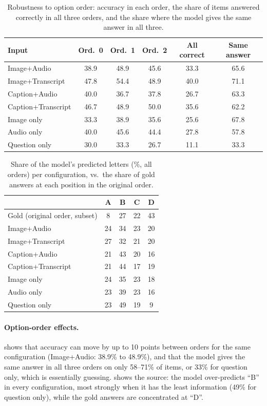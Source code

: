\documentclass{article}
\begin{document}
\begin{table}[h]
\caption{Robustness to option order: accuracy in each order, the share of items answered correctly in
all three orders, and the share where the model gives the same answer in all three.}
\label{tab:app-perm}
\centering\small
\setlength{\tabcolsep}{3.5pt}
\begin{tabular}{lccccc}
\toprule
Input & Ord.\ 0 & Ord.\ 1 & Ord.\ 2 & All correct & Same answer \\
\midrule
Image+Audio        & 38.9 & 48.9 & 45.6 & 33.3 & 65.6 \\
Image+Transcript   & 47.8 & 54.4 & 48.9 & 40.0 & 71.1 \\
Caption+Audio      & 40.0 & 36.7 & 37.8 & 26.7 & 63.3 \\
Caption+Transcript & 46.7 & 48.9 & 50.0 & 35.6 & 62.2 \\
Image only         & 33.3 & 38.9 & 35.6 & 25.6 & 67.8 \\
Audio only         & 40.0 & 45.6 & 44.4 & 27.8 & 57.8 \\
Question only      & 30.0 & 33.3 & 26.7 & 11.1 & 33.3 \\
\bottomrule
\end{tabular}
\end{table}

\begin{table}[h]
\caption{Share of the model's predicted letters (\%, all orders) per configuration, vs.\ the share of
gold answers at each position in the original order.}
\label{tab:app-letters}
\centering\small
\begin{tabular}{lcccc}
\toprule
 & A & B & C & D \\
\midrule
Gold (original order, subset) & 8 & 27 & 22 & 43 \\
\midrule
Image+Audio        & 24 & 34 & 23 & 20 \\
Image+Transcript   & 27 & 32 & 21 & 20 \\
Caption+Audio      & 21 & 43 & 20 & 16 \\
Caption+Transcript & 21 & 44 & 17 & 19 \\
Image only         & 24 & 35 & 23 & 18 \\
Audio only         & 23 & 39 & 23 & 16 \\
Question only      & 23 & 49 & 19 &  9 \\
\bottomrule
\end{tabular}
\end{table}

\paragraph{Option-order effects.}  shows that accuracy can
move by up to 10 points between orders for the same configuration (Image+Audio:
38.9\% to 48.9\%), and that the model gives the same answer in all three orders
on only 58--71\% of items, or 33\% for question only, which is essentially guessing.
 shows the source: the model over-predicts ``B'' in every
configuration, most strongly when it has the least information (49\% for question
only), while the gold answers are concentrated at ``D''.
\end{document}

